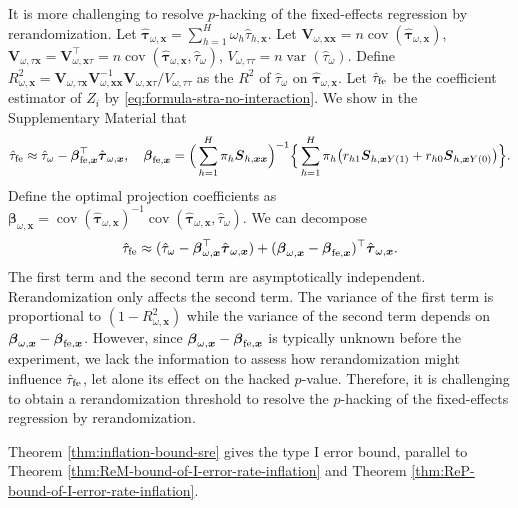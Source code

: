 \documentclass[12pt]{article}
\newcommand{\cov}{\operatorname{cov}}
\newcommand{\var}{\operatorname{var}}
\newcommand{\fe}{\textnormal{fe}}
\newcommand{\bs}{\boldsymbol}
\begin{document}
  It is more challenging to resolve $p$-hacking of the fixed-effects regression by rerandomization. Let $\hat{\bs{\tau}}_{\omega, \bs{x}} = \sum_{h=1}^H \omega_{ h } \hat{\tau}_{h,\bs{x}}$.  Let $\bs{V}_{\omega,\bs{x}\bs{x}} = n\cov( \hat{\bs{\tau}}_{\omega, \bs{x}})$, $\bs{V}_{\omega,\tau\bs{x}} = \bs{V}_{\omega,\bs{x}\tau}^\top = n\cov( \hat{\bs{\tau}}_{\omega, \bs{x}},\hat{\tau}_{\omega})$, ${V}_{\omega,\tau\tau} = n\var(\hat{\tau}_{\omega}).$ Define $R^2_{\omega, \bs{x}} =  \bs{V}_{\omega,\tau\bs{x}}\bs{V}_{\omega,\bs{x}\bs{x}}^{-1}\bs{V}_{\omega,\bs{x}\tau}/{V}_{\omega,\tau\tau}$ as the $R^2$ of $\hat{\tau}_{\omega}$ on $\hat{\bs{\tau}}_{\omega, \bs{x}}$. Let $\hat{\tau}_{\fe}$ be the coefficient estimator of $Z_i$ by \eqref{eq:formula-stra-no-interaction}. We show in the Supplementary Material that
\begin{align*}
     \hat{\tau}_{\fe} \approx \hat{\tau}_{\omega} - \bs{\beta}_{\fe,\bs{x}}^\top \hat{\bs{\tau}}_{\omega,\bs{x}},\quad \bs{\beta}_{\fe,\bs{x}} = \Big(\sum_{h=1}^H \pi_{ h }\bs{S}_{h, \bs{x}\bs{x}}\Big)^{-1}\Big\{\sum_{h=1}^H \pi_{ h }\big(r_{h1}\bs{S}_{h,\bs{x} Y(1)}+r_{h0}\bs{S}_{h,\bs{x} Y(0)}\big)\Big\}.
\end{align*}
Define the optimal projection coefficients as $\bs{\beta}_{\omega,\bs{x}} = \cov(\hat{\bs{\tau}}_{\omega,\bs{x}})^{-1}\cov(\hat{\bs{\tau}}_{\omega,\bs{x}},\hat{\tau}_{\omega})$. We can decompose
\[
\hat{\tau}_{\fe} \approx (\hat{\tau}_{\omega} - \bs{\beta}_{\omega,\bs{x}}^\top \hat{\bs{\tau}}_{\omega,\bs{x}}) + (\bs{\beta}_{\omega,\bs{x}} - \bs{\beta}_{\fe,\bs{x}})^\top \hat{\bs{\tau}}_{\omega,\bs{x}}.
\]
The first term and the second term are asymptotically independent. Rerandomization only affects the second term. The variance of the first term is proportional to $(1-R^2_{\omega,\bs{x}})$ while the variance of the second term depends on $\bs{\beta}_{\omega,\bs{x}}-\bs{\beta}_{\fe,\bs{x}}$.  However, since $\bs{\beta}_{\omega,\bs{x}}-\bs{\beta}_{\fe,\bs{x}}$ is typically unknown before the experiment, we lack the information to assess how rerandomization might influence $\hat{\tau}_{\fe}$, let alone its effect on the hacked $p$-value. Therefore, it is challenging to obtain a rerandomization threshold to resolve the $p$-hacking of the fixed-effects regression by rerandomization.


Theorem \ref{thm:inflation-bound-sre} gives the type I error bound, parallel to Theorem \ref{thm:ReM-bound-of-I-error-rate-inflation} and Theorem \ref{thm:ReP-bound-of-I-error-rate-inflation}.
\end{document}
